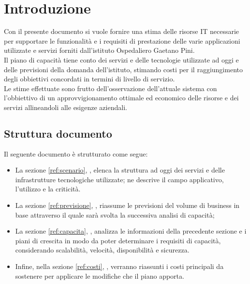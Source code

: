 \newpage

\section{Introduzione} \label{intro}
	Con il presente documento si vuole fornire una stima delle risorse IT necessarie per supportare le funzionalità e i requisiti di prestazione delle varie applicazioni utilizzate e servizi forniti dall'istituto  Ospedaliero Gaetano Pini.\\
	Il piano di capacità tiene conto dei servizi e delle tecnologie utilizzate ad oggi e delle previsioni della domanda dell'istituto, stimando costi per il raggiungimento degli obbiettivi concordati in termini di livello di servizio. \\
	Le stime effettuate sono frutto dell'osservazione dell'attuale sistema con l'obbiettivo di un approvvigionamento ottimale ed economico delle risorse e dei servizi allineandoli alle esigenze aziendali.
	
	\subsection{Struttura documento}
	Il seguente documento è strutturato come segue:
	\begin{itemize}
		\item La sezione \ref{ref:scenario}, , elenca la struttura ad oggi dei servizi e delle infrastrutture tecnologiche utilizzate; ne descrive il campo applicativo, l'utilizzo e la criticità.
		\item La sezione \ref{ref:previsione}, ,  riassume le previsioni del volume di business in base attraverso il quale sarà svolta la successiva analisi di capacità;
		\item La sezione \ref{ref:capacita}, , analizza le informazioni della precedente sezione e i piani di crescita in modo da poter determinare i requisiti di capacità, considerando scalabilità, velocità, disponibilità e sicurezza.
		\item Infine, nella sezione \ref{ref:costi}, , verranno riassunti i costi principali da sostenere per applicare le modifiche che il piano apporta.
	\end{itemize}